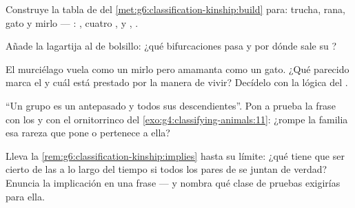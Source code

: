 \begin{exercise}[$\star\star$]\label{exo:g6:classification-kinship:8}
Construye la tabla de  del
\cref{met:g6:classification-kinship:build} para: trucha, rana, gato y
mirlo --- : , cuatro ,  y
, .
\end{exercise}

\begin{exercise}[$\star\star$]\label{exo:g6:classification-kinship:9}
Añade la lagartija al  de bolsillo: ¿qué bifurcaciones pasa y por
dónde sale su ?
\end{exercise}

\begin{exercise}[$\star\star$]\label{exo:g6:classification-kinship:10}
El murciélago vuela como un mirlo pero amamanta como un gato. ¿Qué
parecido marca el  y cuál está prestado por la manera de
vivir? Decídelo con la lógica del .
\end{exercise}

\begin{exercise}[$\star\star$]\label{exo:g6:classification-kinship:11}
``Un grupo es un antepasado y todos sus descendientes''. Pon a prueba
la frase con los  y con el ornitorrinco del
\cref{exo:g4:classifying-animals:11}: ¿rompe la familia esa rareza que
pone  o pertenece a ella?
\end{exercise}

\begin{exercise}[$\star\star\star$]\label{exo:g6:classification-kinship:12}
Lleva la \cref{rem:g6:classification-kinship:implies} hasta su límite:
¿qué tiene que ser cierto de las  a lo largo del tiempo si
todos los pares de  se juntan de verdad? Enuncia la implicación en
una frase --- y nombra qué clase de pruebas exigirías para ella.
\end{exercise}

